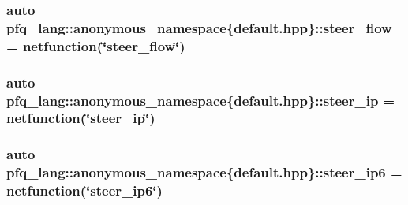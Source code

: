 \hypertarget{namespacepfq__lang_1_1anonymous__namespace_02default_8hpp_03_aee7b4eb8c316f9c0cd6ee7bc22b517ef}{
\subsubsection[{steer\+\_\+flow}]{\setlength{\rightskip}{0pt plus 5cm}auto pfq\+\_\+lang\+::anonymous\+\_\+namespace\{default.\+hpp\}\+::steer\+\_\+flow = {\bf netfunction}(\char`\"{}steer\+\_\+flow\char`\"{})}}\label{namespacepfq__lang_1_1anonymous__namespace_02default_8hpp_03_aee7b4eb8c316f9c0cd6ee7bc22b517ef}
\hypertarget{namespacepfq__lang_1_1anonymous__namespace_02default_8hpp_03_ab44cbea49db522460c5bce82d04280cd}{
\subsubsection[{steer\+\_\+ip}]{\setlength{\rightskip}{0pt plus 5cm}auto pfq\+\_\+lang\+::anonymous\+\_\+namespace\{default.\+hpp\}\+::steer\+\_\+ip = {\bf netfunction}(\char`\"{}steer\+\_\+ip\char`\"{})}}\label{namespacepfq__lang_1_1anonymous__namespace_02default_8hpp_03_ab44cbea49db522460c5bce82d04280cd}
\hypertarget{namespacepfq__lang_1_1anonymous__namespace_02default_8hpp_03_a011de504f63578469615a302f823d238}{
\subsubsection[{steer\+\_\+ip6}]{\setlength{\rightskip}{0pt plus 5cm}auto pfq\+\_\+lang\+::anonymous\+\_\+namespace\{default.\+hpp\}\+::steer\+\_\+ip6 = {\bf netfunction}(\char`\"{}steer\+\_\+ip6\char`\"{})}}\label{namespacepfq__lang_1_1anonymous__namespace_02default_8hpp_03_a011de504f63578469615a302f823d238}
